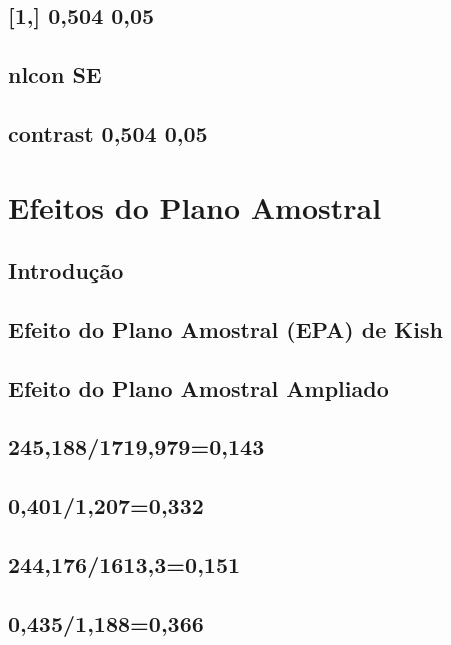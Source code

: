 \documentclass[]{book}
\theoremstyle{definition}
\theoremstyle{definition}
\theoremstyle{definition}
\theoremstyle{remark}
\begin{document}
\section{{[}1,{]} 0,504 0,05}\label{section-9}

\section{nlcon SE}\label{nlcon-se}

\section{contrast 0,504 0,05}\label{contrast-0504-005}

\chapter{Efeitos do Plano Amostral}\label{epa}

\section{Introdução}\label{introducao}

\section{Efeito do Plano Amostral (EPA) de
Kish}\label{efeito-do-plano-amostral-epa-de-kish}

\section{Efeito do Plano Amostral
Ampliado}\label{efeito-do-plano-amostral-ampliado}

\section{245,188/1719,979=0,143}\label{section-10}

\section{0,401/1,207=0,332}\label{section-11}

\section{244,176/1613,3=0,151}\label{section-12}

\section{0,435/1,188=0,366}\label{section-13}
\end{document}
